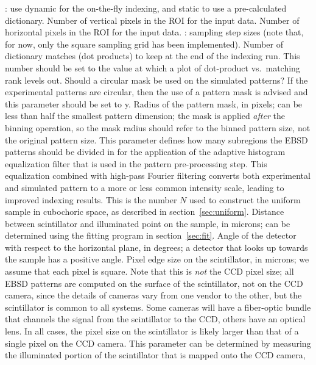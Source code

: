 \documentclass[DIV=calc, paper=letter, fontsize=11pt]{scrartcl}	 %
\begin{document}
\begin{itemize}
: use \textsf{dynamic} for the on-the-fly indexing, and \textsf{static} to use a pre-calculated dictionary.
 Number of vertical pixels in the ROI for the input data. 
 Number of horizontal pixels in the ROI for the input data. 
: sampling step sizes (note that, for now, only the square sampling grid has been implemented).
 Number of dictionary matches (dot products) to keep at the end of the indexing run. This number should be set to the value at which a plot of dot-product vs.\ matching rank levels out. 
 Should a circular mask be used on the simulated patterns?  If the experimental patterns are circular, then the use of a pattern mask is advised and this parameter
should be set to \textsf{y}.
 Radius of the pattern mask, in pixels; can be less than half the smallest pattern dimension; the mask is applied \textit{after} the binning operation, so the mask radius should refer to the binned pattern size, not the original pattern size.
 This parameter defines how many subregions the EBSD patterns should be divided in for the application of the adaptive histogram equalization filter that is used in the pattern pre-processing step.  This equalization combined with high-pass Fourier filtering converts both experimental and simulated pattern to a more or less common intensity scale, leading to improved indexing results.
 This is the number $N$ used to construct the uniform sample in cubochoric space, as described in section~\ref{sec:uniform}.
 Distance between scintillator and illuminated point on the sample, in microns; can be determined using the fitting program in section~\ref{sec:fit}. 
 Angle of the detector with respect to the horizontal plane, in degrees; a detector that looks up towards the sample has a positive angle. 
 Pixel edge size on the scintillator, in microns;  we assume that each pixel is square.  Note that this is \textit{not} the CCD pixel size; all EBSD patterns are computed on the surface of the scintillator, not on the CCD camera, since the details of cameras vary from one vendor to the other, but the scintillator is common to all systems. Some cameras will have 
a fiber-optic bundle that channels the signal from the scintillator to the CCD, others have an optical lens.  In all cases, the pixel size on the scintillator is likely larger
than that of a single pixel on the CCD camera.  This parameter can be determined by measuring the illuminated portion of the scintillator that is mapped onto the CCD camera, 

\end{itemize}
\end{document}
